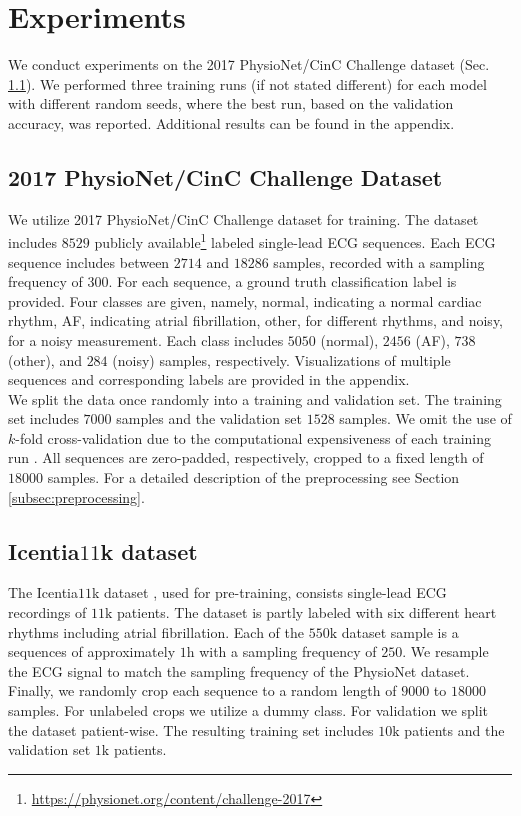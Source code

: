 \section{Experiments} \label{sec:experiments}

We conduct experiments on the 2017 PhysioNet/CinC Challenge dataset \cite{Clifford2017} (Sec. \ref{subsec:physionet_dataset}). We performed three training runs (if not stated different) for each model with different random seeds, where the best run, based on the validation accuracy, was reported. Additional results can be found in the appendix.

\subsection{2017 PhysioNet/CinC Challenge Dataset} \label{subsec:physionet_dataset}

We utilize 2017 PhysioNet/CinC Challenge dataset \cite{Clifford2017} for training. The dataset includes $8529$ publicly available\footnote{\url{https://physionet.org/content/challenge-2017}} labeled single-lead ECG sequences. Each ECG sequence includes between $2714$ and $18286$ samples, recorded with a sampling frequency of $300$. For each sequence, a ground truth classification label is provided. Four classes are given, namely, normal, indicating a normal cardiac rhythm, AF, indicating atrial fibrillation, other, for different rhythms, and noisy, for a noisy measurement. Each class includes $5050$ (normal), $2456$ (AF), $738$ (other), and $284$ (noisy) samples, respectively. Visualizations of multiple sequences and corresponding labels are provided in the appendix. \\
\indent We split the data once randomly into a training and validation set. The training set includes $7000$ samples and the validation set $1528$ samples. We omit the use of $k$-fold cross-validation due to the computational expensiveness of each training run \cite{Bishop2006, Goodfellow2016}. All sequences are zero-padded, respectively, cropped to a fixed length of $18000$ samples. For a detailed description of the preprocessing see Section \ref{subsec:preprocessing}.

\subsection{Icentia$11$k dataset} \label{subsec:icentia11k_dataset}

The Icentia$11$k dataset \cite{Tan2019}, used for pre-training, consists single-lead ECG recordings of $11\si{\kilo}$ patients. The dataset is partly labeled with six different heart rhythms including atrial fibrillation. Each of the $550\si{\kilo}$ dataset sample is a sequences of approximately $1\si{\hour}$ with a sampling frequency of $250$. We resample the ECG signal to match the sampling frequency of the PhysioNet dataset. Finally, we randomly crop each sequence to a random length of $9000$ to $18000$ samples. For unlabeled crops we utilize a dummy class. For validation we split the dataset patient-wise. The resulting training set includes $10\si{\kilo}$ patients and the validation set $1\si{\kilo}$ patients.

